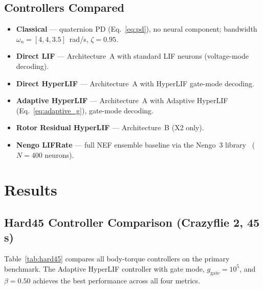 \documentclass[conference]{IEEEtran}
\begin{document}
\subsection{Controllers Compared}

\begin{itemize}
  \item \textbf{Classical} — quaternion PD (Eq.~\eqref{eq:pd}), no neural
        component; bandwidth $\omega_n=[4,4,3.5]$~rad/s, $\zeta=0.95$.
  \item \textbf{Direct LIF} — Architecture~A with standard LIF neurons
        (voltage-mode decoding).
  \item \textbf{Direct HyperLIF} — Architecture~A with HyperLIF gate-mode
        decoding.
  \item \textbf{Adaptive HyperLIF} — Architecture~A with Adaptive HyperLIF
        (Eq.~\eqref{eq:adaptive_g}), gate-mode decoding.
  \item \textbf{Rotor Residual HyperLIF} --- Architecture~B (X2 only).
  \item \textbf{Nengo LIFRate} --- full NEF ensemble baseline via the
        Nengo~3 library~\cite{bekolay2014nengo} ($N{=}400$ neurons).
\end{itemize}

\section{Results}
\label{sec:results}

\subsection{Hard45 Controller Comparison (Crazyflie 2, 45 s)}

Table~\ref{tab:hard45} compares all body-torque controllers on the primary
benchmark.
The Adaptive HyperLIF controller with gate mode, $g_{\mathrm{gate}} = 10^5$,
and $\beta = 0.50$ achieves the best performance across all four metrics.
\end{document}
